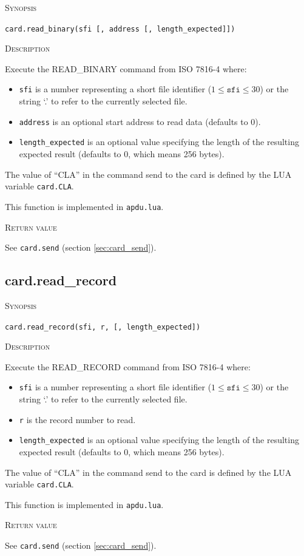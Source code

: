 \documentclass[11pt]{report}
\newcommand{\mansection}[1]{\vspace{0.5em}\par\noindent\textsc{#1}\vspace{0.5em}\par}
\newcommand{\syn}[1]{\texttt{#1}}
\begin{document}
\mansection{Synopsis}
\syn{card.read\_binary(sfi [, address [, length\_expected]])}


\mansection{Description}
  Execute the READ\_BINARY command from ISO 7816-4 where:
  \begin{itemize}
  \item{\syn{sfi} is a number representing a short file identifier ($1 \le \syn{sfi} \le 30$) or the string `.' to refer to the currently selected file.}
  \item{\syn{address} is an optional start address to read data (defaults to 0).}
  \item{\syn{length\_expected} is an optional value specifying the length of the resulting expected result (defaults to 0, which means 256 bytes).}
  \end{itemize}

  The value of ``CLA'' in the command send to the card is defined by the LUA variable \syn{card.CLA}.

  This function is implemented in \syn{apdu.lua}.

\mansection{Return value}
  See \syn{card.send} (section \ref{sec:card_send}).


\subsection{card.read\_record}

\mansection{Synopsis}
\syn{card.read\_record(sfi, r, [, length\_expected])}


\mansection{Description}
  Execute the READ\_RECORD command from ISO 7816-4 where:
  \begin{itemize}
  \item{\syn{sfi} is a number representing a short file identifier ($1 \le \syn{sfi} \le 30$) or the string `.' to refer to the currently selected file.}
  \item{\syn{r} is the record number to read.}
  \item{\syn{length\_expected} is an optional value specifying the length of the resulting expected result (defaults to 0, which means 256 bytes).}
  \end{itemize}

  The value of ``CLA'' in the command send to the card is defined by the LUA variable \syn{card.CLA}.

  This function is implemented in \syn{apdu.lua}.

\mansection{Return value}
  See \syn{card.send} (section \ref{sec:card_send}).
\end{document}
